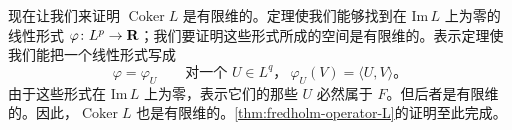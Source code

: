 现在让我们来证明 $\operatorname{Coker}L$ 是有限维的。\trHahnBanach{}定理使我们能够找到在 $\mathrm{Im}\,L$ 上为零的线性形式 $\varphi\colon L^{p}\to\mathbf{R}$；我们要证明这些形式所成的空间是有限维的。\trRiesz{}表示定理使我们能把一个线性形式写成
\[
\varphi=\varphi_U\qquad\text{对一个 }U\in L^{q}\text{，}\ \varphi_U(V)=\langle U,V\rangle\text{。}
\]
由于这些形式在 $\mathrm{Im}\,L$ 上为零，表示它们的那些 $U$ 必然属于 $F$。但后者是有限维的。因此，$\operatorname{Coker}L$ 也是有限维的。\cref{thm:fredholm-operator-L}的证明至此完成。
\noqed

